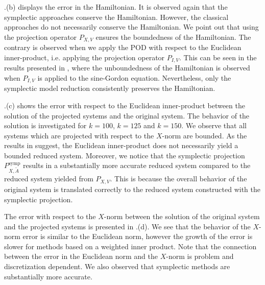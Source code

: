 .(b) displays the error in the Hamiltonian. It is observed again that the symplectic approaches conserve the Hamiltonian. However, the classical approaches do not necessarily conserve the Hamiltonian. We point out that using the projection operator $P_{X,V}$ ensures the boundedness of the Hamiltonian. The contrary is observed when we apply the POD with respect to the Euclidean inner-product, i.e. applying the projection operator $P_{I,V}$. This can be seen in the results presented in \cite{doi:10.1137/140978922}, where the unboundedness of the Hamiltonian is observed when $P_{I,V}$ is applied to the sine-Gordon equation. Nevertheless, only the symplectic model reduction consistently preserves the Hamiltonian.

.(c) shows the error with respect to the Euclidean inner-product between the solution of the projected systems and the original system. The behavior of the solution is investigated for $k=100$, $k=125$ and $k=150$. We observe that all systems which are projected with respect to the $X$-norm are bounded. As the results in \cite{doi:10.1137/140978922} suggest, the Euclidean inner-product does not necessarily yield a bounded reduced system. Moreover, we notice that the symplectic projection $P^{\text{symp}}_{X,\tilde A}$ results in a substantially more accurate reduced system compared to the reduced system yielded from $P_{X,V}$. This is because the overall behavior of the original system is translated correctly to the reduced system constructed with the symplectic projection.

The error with respect to the $X$-norm between the solution of the original system and the projected systems is presented in .(d). We see that the behavior of the $X$-norm error is similar to the Euclidean norm, however the growth of the error is slower for methods based on a weighted inner product. Note that the connection between the error in the Euclidean norm and the $X$-norm is problem and discretization dependent. We also observed that symplectic methods are substantially more accurate.

